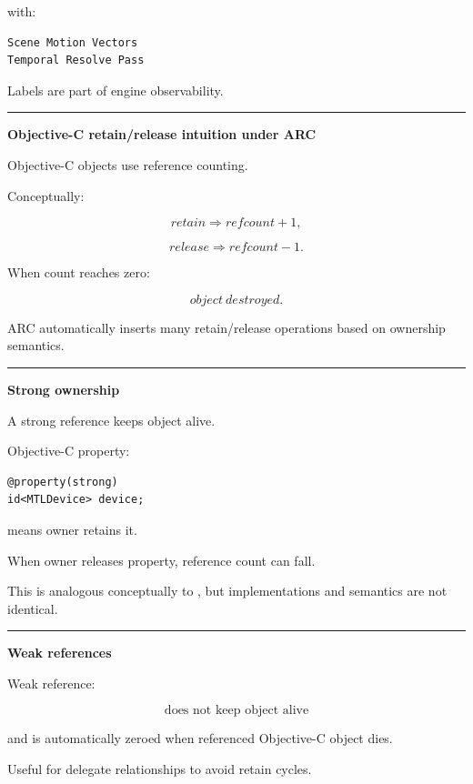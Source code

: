 with:

\begin{verbatim}
Scene Motion Vectors
Temporal Resolve Pass
\end{verbatim}

Labels are part of engine observability.

\begin{center}\rule{0.5\linewidth}{0.5pt}\end{center}

\textbf{Objective-C retain/release intuition under ARC}

Objective-C objects use reference counting.

Conceptually:

\[
retain
\Rightarrow
refcount+1,
\]

\[
release
\Rightarrow
refcount-1.
\]

When count reaches zero:

\[
object\ destroyed.
\]

ARC automatically inserts many retain/release operations based on ownership semantics.

\begin{center}\rule{0.5\linewidth}{0.5pt}\end{center}

\textbf{Strong ownership}

A strong reference keeps object alive.

Objective-C property:

\begin{verbatim}
@property(strong)
id<MTLDevice> device;
\end{verbatim}

means owner retains it.

When owner releases property, reference count can fall.

This is analogous conceptually to , but implementations and semantics are not identical.

\begin{center}\rule{0.5\linewidth}{0.5pt}\end{center}

\textbf{Weak references}

Weak reference:

\[
\boxed{\text{does not keep object alive}}
\]

and is automatically zeroed when referenced Objective-C object dies.

Useful for delegate relationships to avoid retain cycles.

